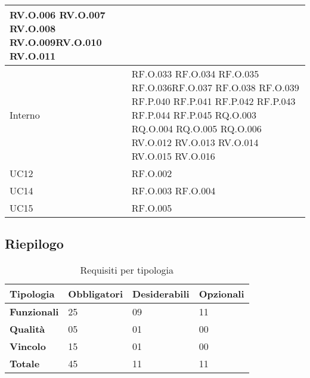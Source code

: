 \begin{longtable}{|C{3.0cm}|C{3.0cm}|}
RV.O.006 \newline RV.O.007 \newline RV.O.008  \newline  RV.O.009\newline RV.O.010 \newline
RV.O.011 \\
          \hline 
          Interno & 
          RF.O.033  \newline RF.O.034  \newline RF.O.035  \newline  RF.O.036\newline RF.O.037 \newline
          RF.O.038  \newline RF.O.039  \newline RF.P.040  \newline  RF.P.041 \newline RF.P.042 \newline
          RF.P.043  \newline RF.P.044 \newline RF.P.045  \newline  RQ.O.003  \newline RQ.O.004  \newline
          RQ.O.005  \newline RQ.O.006  \newline RV.O.012  \newline  RV.O.013   \newline RV.O.014   \newline
          RV.O.015   \newline RV.O.016   \\
          \hline       
          UC12 & RF.O.002 \\
          \hline 
          UC14 & RF.O.003  \newline RF.O.004 \\
          \hline 
          UC15 & RF.O.005 \\
          \hline 

    \end{longtable}

\subsection{Riepilogo}
\begin{table}[H]
\centering
    \begin{tabular}{|C{3.0cm}|C{2.5cm}|C{2.5cm}|C{2.5cm}|}
        \hline
         \textbf{Tipologia} &
         \textbf{Obbligatori} & 
         \textbf{Desiderabili} &
         \textbf{Opzionali} 
          \\
          \hline
          \textbf{Funzionali} & 25 & 09 & 11 \\
          \hline 
          \textbf{Qualità} & 05 & 01 & 00\\
          \hline
          \textbf{Vincolo} & 15 & 01 & 00\\
          \hline
          \textbf{Totale} & 45 & 11 & 11\\
          \hline
    \end{tabular}
    \caption{Requisiti per tipologia}
\end{table}
